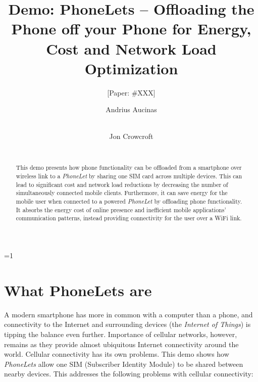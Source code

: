 \documentclass{sig-alternate-2013}
\def\anon{0}        %
\begin{document}
\date{}


\title{Demo: PhoneLets -- Offloading the Phone off your Phone for Energy, Cost and Network Load Optimization}
\ifnum\anon=1
\author{[Paper: \#XXX]}%
\else
{}
\author{
\alignauthor Andrius Aucinas\\
\\
\and
\alignauthor Jon Crowcroft\\
\\
}
\fi

    
\maketitle
\begin{abstract}
This demo presents how phone functionality can be offloaded from a smartphone over wireless link to a \emph{PhoneLet} by sharing one SIM card across multiple devices. This can lead to significant cost and network load reductions by decreasing the number of simultaneously connected mobile clients. Furthermore, it can save energy for the mobile user when connected to a powered \emph{PhoneLet} by offloading phone functionality. It absorbs the energy cost of online presence and inefficient mobile applications' communication patterns, instead providing connectivity for the user over a WiFi link.
\end{abstract} 



\section{What PhoneLets are}
\label{section:intro}

A modern smartphone has more in common with a computer than a phone, and connectivity to the Internet and surrounding devices (the \emph{Internet of Things}) is tipping the balance even further. Importance of cellular networks, however, remains as they provide almost ubiquitous Internet connectivity around the world. Cellular connectivity has its own problems. This demo shows how \emph{PhoneLets} allow one SIM (Subscriber Identity Module) to be shared between nearby devices. This addresses the following problems with cellular connectivity:
\end{document}
